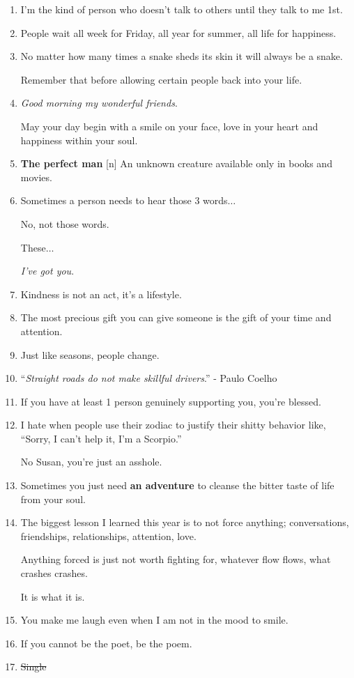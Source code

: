 \documentclass{article}
\numberwithin{equation}{section}
\begin{document}
\begin{enumerate}
    \textit{A person for life} or \textit{A lesson for life}$\ldots$
    \item I'm the kind of person who doesn't talk to others until they talk to me 1st.
    \item People wait all week for Friday, all year for summer, all life for happiness.
    \item No matter how many times a snake sheds its skin it will always be a snake.
    
    Remember that before allowing certain people back into your life.
    \item \textit{Good morning my wonderful friends}.
    
    May your day begin with a smile on your face, love in your heart and happiness within your soul.
    \item \textbf{The perfect man} [n] An unknown creature available only in books and movies.
    \item Sometimes a person needs to hear those 3 words$\ldots$
    
    No, not those words.
    
    These$\ldots$
    
    \textit{I've got you}.
    \item Kindness is not an act, it's a lifestyle.
    \item The most precious gift you can give someone is the gift of your time and attention.
    \item Just like seasons, people change.
    \item ``\textit{Straight roads do not make skillful drivers}.'' - Paulo Coelho
    \item If you have at least 1 person genuinely supporting you, you're blessed.
    \item I hate when people use their zodiac to justify their shitty behavior like, ``Sorry, I can't help it, I'm a Scorpio.''
    
    No Susan, you're just an asshole.
    \item Sometimes you just need \textbf{an adventure} to cleanse the bitter taste of life from your soul.
    \item The biggest lesson I learned this year is to not force anything; conversations, friendships, relationships, attention, love.
    
    Anything forced is just not worth fighting for, whatever flow flows, what crashes crashes.
    
    It is what it is.
    \item You make me laugh even when I am not in the mood to smile.
    \item If you cannot be the poet, be the poem.
    \item \st{Single}
    

\end{enumerate}
\end{document}

